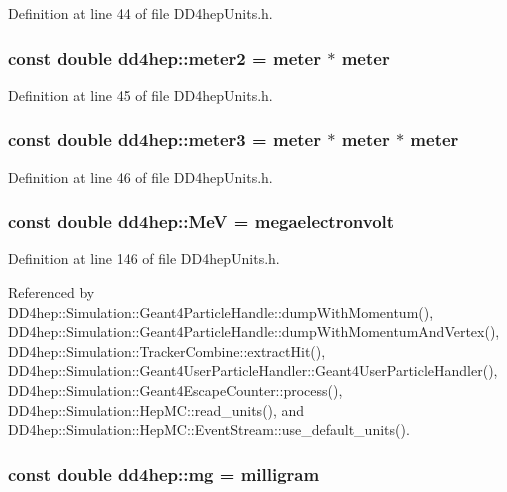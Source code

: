 Definition at line 44 of file DD4hepUnits.h.\hypertarget{namespacedd4hep_afe718b0d811af6b4d45c556e3a0e87a3}{
\subsubsection[{meter2}]{\setlength{\rightskip}{0pt plus 5cm}const double {\bf dd4hep::meter2} = {\bf meter} $\ast$ {\bf meter}}}
\label{namespacedd4hep_afe718b0d811af6b4d45c556e3a0e87a3}


Definition at line 45 of file DD4hepUnits.h.\hypertarget{namespacedd4hep_a4f771b88b1ff2018c0dacd3a1b56023b}{
\subsubsection[{meter3}]{\setlength{\rightskip}{0pt plus 5cm}const double {\bf dd4hep::meter3} = {\bf meter} $\ast$ {\bf meter} $\ast$ {\bf meter}}}
\label{namespacedd4hep_a4f771b88b1ff2018c0dacd3a1b56023b}


Definition at line 46 of file DD4hepUnits.h.\hypertarget{namespacedd4hep_a6dee62809c6ee54d2fc90671f4dc8b91}{
\subsubsection[{MeV}]{\setlength{\rightskip}{0pt plus 5cm}const double {\bf dd4hep::MeV} = {\bf megaelectronvolt}}}
\label{namespacedd4hep_a6dee62809c6ee54d2fc90671f4dc8b91}


Definition at line 146 of file DD4hepUnits.h.

Referenced by DD4hep::Simulation::Geant4ParticleHandle::dumpWithMomentum(), DD4hep::Simulation::Geant4ParticleHandle::dumpWithMomentumAndVertex(), DD4hep::Simulation::TrackerCombine::extractHit(), DD4hep::Simulation::Geant4UserParticleHandler::Geant4UserParticleHandler(), DD4hep::Simulation::Geant4EscapeCounter::process(), DD4hep::Simulation::HepMC::read\_\-units(), and DD4hep::Simulation::HepMC::EventStream::use\_\-default\_\-units().\hypertarget{namespacedd4hep_a16e0deb2b676a8d02ab7cf5cf7a8237b}{
\subsubsection[{mg}]{\setlength{\rightskip}{0pt plus 5cm}const double {\bf dd4hep::mg} = {\bf milligram}}}
\label{namespacedd4hep_a16e0deb2b676a8d02ab7cf5cf7a8237b}


